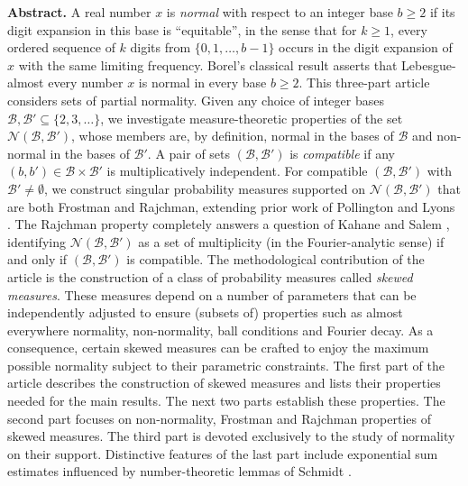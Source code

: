 \documentclass[12pt, twoside]{article}
\theoremstyle{definition}
\numberwithin{equation}{section}
\begin{document}
\begin{center}
\begin{minipage}{13cm}
{\small {\bf Abstract.} A real number $x$ is {\em{normal}} with respect to an integer base $b \geq 2$ if its digit expansion in this base is ``equitable'', in the sense that for $k \geq 1$, every ordered sequence of $k$ digits from $\{0, 1, \ldots, b-1\}$ occurs in the digit expansion of $x$ with the same limiting frequency. Borel's classical result \cite{b09} asserts that Lebesgue-almost every number $x$ is normal in every base $b \geq 2$. This three-part article considers sets of partial normality. Given any choice of integer bases $\mathscr{B}, \mathscr{B}' \subseteq \{2, 3, \ldots\}$, we investigate measure-theoretic properties of the set $\mathscr{N}(\mathscr{B}, \mathscr{B}')$, whose members are, by definition, normal in the bases of $\mathscr{B}$ and non-normal in the bases of $\mathscr{B}'$.
\vskip0.1in 
\noindent A pair of sets $(\mathscr{B}, \mathscr{B}')$ is {\em{compatible}} if 
any $(b, b') \in \mathscr{B} \times \mathscr{B}'$ is multiplicatively independent. For compatible $(\mathscr{B}, \mathscr{B}')$ with $\mathscr{B}' \ne \emptyset$, we construct singular probability measures supported on $\mathscr N(\mathscr{B}, \mathscr{B}')$  that are both Frostman and Rajchman, extending prior work of Pollington \cite{p81} and Lyons \cite{l86}. The Rajchman property completely answers a question of Kahane and Salem \cite{Kahane-Salem-64}, identifying $\mathscr N(\mathscr{B}, \mathscr{B}')$ as a set of multiplicity (in the Fourier-analytic sense) if and only if $(\mathscr{B}, \mathscr{B}')$ is compatible.  
\vskip0.1in
\noindent The methodological contribution of the article is the construction of a class of probability measures called {\em{skewed measures}}. These measures depend on a number of parameters that can be independently adjusted to ensure (subsets of) properties such as almost everywhere normality, non-normality, ball conditions and Fourier decay. As a consequence, certain skewed measures can be crafted  to enjoy the maximum possible normality subject to their parametric constraints. The first part of the article describes the construction of skewed measures and lists their properties needed for the main results. The next two parts establish these properties. The second part focuses on non-normality, Frostman and Rajchman properties of skewed measures. The third part is devoted exclusively to the study of normality on their support. Distinctive features of the last part include exponential sum estimates influenced by number-theoretic lemmas of Schmidt \cite{s60}.   
}
\end{minipage}
\end{center}
\end{document}
